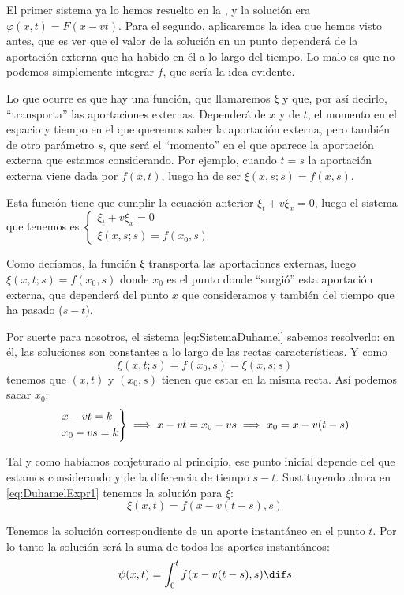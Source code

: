 			El primer sistema ya lo hemos resuelto en la , y la solución era ${φ(x,t) = F(x - vt)}$. Para el segundo, aplicaremos la idea que hemos visto antes, que es ver que el valor de la solución en un punto dependerá de la aportación externa que ha habido en él a lo largo del tiempo. Lo malo es que no podemos simplemente integrar $f$, que sería la idea evidente.

			Lo que ocurre es que hay una función, que llamaremos ξ y que, por así decirlo, ``transporta'' las aportaciones externas. Dependerá de $x$ y de $t$, el momento en el espacio y tiempo en el que queremos saber la aportación externa, pero también de otro parámetro $s$, que será el ``momento'' en el que aparece la aportación externa que estamos considerando. Por ejemplo, cuando $t = s$ la aportación externa viene dada por $f(x,t)$, luego ha de ser $ξ(x,s; s) = f(x,s)$.

			Esta función tiene que cumplir la ecuación anterior $ξ_t + v ξ_x = 0$, luego el sistema que tenemos es \( \begin{cases}
			ξ_t + vξ_x = 0 \\
			ξ(x,s;s) = f(x_0,s)
			\end{cases} \label{eq:SistemaDuhamel} \)

			Como decíamos, la función ξ transporta las aportaciones externas, luego \( ξ(x,t; s) = f(x_0, s) \label{eq:DuhamelExpr1} \) donde $x_0$ es el punto donde ``surgió'' esta aportación externa, que dependerá del punto $x$ que consideramos y también del tiempo que ha pasado ($s-t$).

			Por suerte para nosotros, el sistema \eqref{eq:SistemaDuhamel} sabemos resolverlo: en él, las soluciones son constantes a lo largo de las rectas características. Y como $$ξ(x,t;s) = f(x_0, s) = ξ(x,s;s)$$ tenemos que $(x,t)$ y $(x_0, s)$ tienen que estar en la misma recta. Así podemos sacar $x_0$:
			\[
			\begin{rcases}
				x-vt = k\\
				x_0 - vs = k
			\end{rcases}
			 \implies x-vt = x_0 - vs \implies
			x_0 = x-v(t-s) \]

			Tal y como habíamos conjeturado al principio, ese punto inicial depende del que estamos considerando y de la diferencia de tiempo $s-t$. Sustituyendo ahora en \eqref{eq:DuhamelExpr1} tenemos la solución para $ξ$:
			\[ \xi(x,t) = f(x - v(t-s), s) \]

			Tenemos la solución correspondiente de un aporte instantáneo en el punto $t$. Por lo tanto la solución será la suma de todos los aportes instantáneos:
			\[  \psi(x,t) = \int^{t}_{0} f(x-v(t-s),s) \dif s \]

